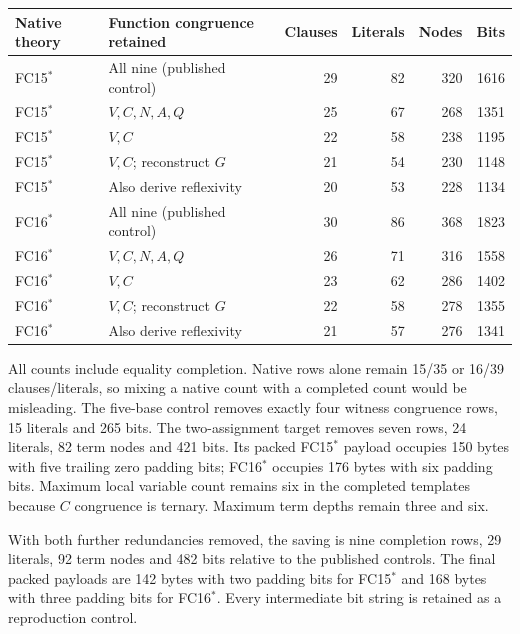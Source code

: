 \begin{center}\small
\begin{tabular}{llrrrr}
\toprule
Native theory & Function congruence retained & Clauses & Literals & Nodes & Bits\\
\midrule
FC15$^*$ & All nine (published control) &29&82&320&1616\\
FC15$^*$ & $V,C,N,A,Q$ &25&67&268&1351\\
FC15$^*$ & $V,C$ &22&58&238&1195\\
FC15$^*$ & $V,C$; reconstruct $G$ &21&54&230&1148\\
FC15$^*$ & Also derive reflexivity &20&53&228&1134\\
\midrule
FC16$^*$ & All nine (published control) &30&86&368&1823\\
FC16$^*$ & $V,C,N,A,Q$ &26&71&316&1558\\
FC16$^*$ & $V,C$ &23&62&286&1402\\
FC16$^*$ & $V,C$; reconstruct $G$ &22&58&278&1355\\
FC16$^*$ & Also derive reflexivity &21&57&276&1341\\
\bottomrule
\end{tabular}
\end{center}
All counts include equality completion. Native rows alone remain 15/35
or 16/39 clauses/literals, so mixing a native count with a completed
count would be misleading. The five-base control removes exactly four
witness congruence rows, 15 literals and 265 bits. The two-assignment
target removes seven rows, 24 literals, 82 term nodes and 421 bits.
Its packed FC15$^*$ payload occupies 150 bytes with five trailing zero
padding bits; FC16$^*$ occupies 176 bytes with six padding bits. Maximum
local variable count remains six in the completed templates because $C$
congruence is ternary. Maximum term depths remain three and six.

With both further redundancies removed, the saving is nine completion
rows, 29 literals, 92 term nodes and 482 bits relative to the published
controls. The final packed payloads are 142 bytes with two padding bits
for FC15$^*$ and 168 bytes with three padding bits for FC16$^*$. Every
intermediate bit string is retained as a reproduction control.

